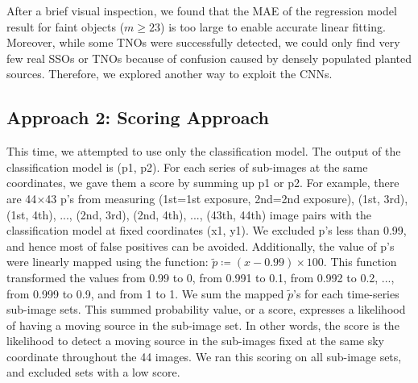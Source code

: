 \documentclass{aastex631}
\begin{document}

After a brief visual inspection, we found that the MAE of the regression model result for faint objects ($m\geq23$) is too large to enable accurate linear fitting.
Moreover, while some TNOs were successfully detected, we could only find very few real SSOs or TNOs because of confusion caused by densely populated planted sources.
Therefore, we explored another way to exploit the CNNs.

\subsection{Approach 2: Scoring Approach}
\label{subsect: Scoring Approach}

This time, we attempted to use only the classification model.
The output of the classification model is (p1, p2).
For each series of sub-images at the same coordinates, we gave them a score by summing up p1 or p2.
For example, there are 44$\times$43 p's from measuring (1st=1st exposure, 2nd=2nd exposure), (1st, 3rd), (1st, 4th), ..., (2nd, 3rd), (2nd, 4th), ..., (43th, 44th) image pairs with the classification model at fixed coordinates (x1, y1).
We excluded p's less than 0.99, and hence most of false positives can be avoided.
Additionally, the value of p's were linearly mapped using the function: $\tilde{p} \coloneqq (x-0.99)\times100$. This function transformed the values from 0.99 to 0, from 0.991 to 0.1, from 0.992 to 0.2, ..., from 0.999 to 0.9, and from 1 to 1.
We sum the mapped $\tilde{p}$'s for each time-series sub-image sets.
This summed probability value, or a score, expresses a likelihood of having a moving source in the sub-image set.
In other words, the score is the likelihood to detect a moving source in the sub-images fixed at the same sky coordinate throughout the 44 images.
We ran this scoring on all sub-image sets, and excluded sets with a low score.
\end{document}
